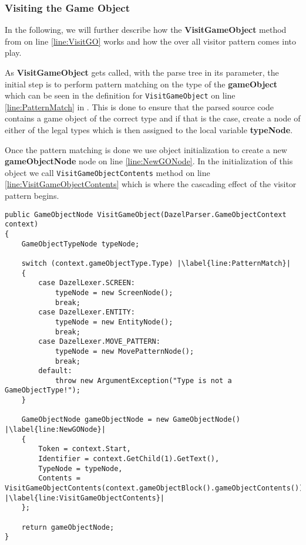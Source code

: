 \subsubsection*{Visiting the Game Object}
In the following, we will further describe how the \textbf{VisitGameObject} method from  on line \ref{line:VisitGO} works and how the over all visitor pattern comes into play.

As \textbf{VisitGameObject} gets called, with the parse tree in its parameter, the initial step is to perform pattern matching on the type of the \textbf{gameObject} which can be seen in the definition for \texttt{VisitGameObject} on line \ref{line:PatternMatch} in . This is done to ensure that the parsed source code contains a game object of the correct type and if that is the case, create a node of either of the legal types which is then assigned to the local variable \textbf{typeNode}.

Once the pattern matching is done we use object initialization to create a new \textbf{gameObjectNode} node on line \ref{line:NewGONode}. In the initialization of this object we call \texttt{VisitGameObjectContents} method on line \ref{line:VisitGameObjectContents} which is where the cascading effect of the visitor pattern begins.

\begin{lstlisting}[language=CSharp, caption={The initial stage of visiting}, label={lst:VisitParseTree},escapechar=|]
public GameObjectNode VisitGameObject(DazelParser.GameObjectContext context)
{
    GameObjectTypeNode typeNode;
    
    switch (context.gameObjectType.Type) |\label{line:PatternMatch}|
    {
        case DazelLexer.SCREEN:
            typeNode = new ScreenNode();
            break;
        case DazelLexer.ENTITY:
            typeNode = new EntityNode();
            break;
        case DazelLexer.MOVE_PATTERN:
            typeNode = new MovePatternNode();
            break;
        default:
            throw new ArgumentException("Type is not a GameObjectType!");
    }

    GameObjectNode gameObjectNode = new GameObjectNode() |\label{line:NewGONode}|
    {
        Token = context.Start,
        Identifier = context.GetChild(1).GetText(),
        TypeNode = typeNode,
        Contents = VisitGameObjectContents(context.gameObjectBlock().gameObjectContents()) |\label{line:VisitGameObjectContents}|
    };
    
    return gameObjectNode;
}
\end{lstlisting}


